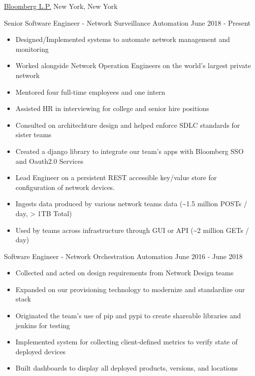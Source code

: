 \documentclass[11pt]{article}
\begin{document}
\headedsection  %
{\href{http://www.bloomberg.com/company}{Bloomberg L.P.}}
{New York, New York}
{
    \headedsubsection
    {Senior Software Engineer - Network Surveillance Automation}
    {June 2018 - Present}
    {
        \begin{itemize}
            \item Designed/Implemented systems to automate network management and monitoring
            \item Worked alongside Network Operation Engineers on the world's largest private network
            \item Mentored four full-time employees and one intern
            \item Assisted HR in interviewing for college and senior hire positions
            \item Consulted on architechture design and helped enforce SDLC standards for sister teams
            \item Created a django library to integrate our team's apps with Bloomberg SSO and Oauth2.0 Services
            \item Lead Engineer on a persistent REST accessible key/value store for configuration of network devices. 
            \item[] \nobreakhspace{1.5em}Ingests data produced by various network teams data (\textasciitilde{}1.5 million POSTs / day, > 1TB Total)
            \item[] \nobreakhspace{1.5em}Used by teams across infrastructure through GUI or API (\textasciitilde{}2 million GETs / day)
        \end{itemize}

    }
    \headedsubsection
    {Software Engineer - Network Orchestration Automation}
    {June 2016 - June 2018}
    {
        \begin{itemize}
            \item Collected and acted on design requirements from Network Design teams
            \item Expanded on our provisioning technology to modernize and standardize our stack
            \item Originated the team's use of pip and pypi to create shareable libraries and jenkins for testing
            \item Implemented system for collecting client-defined metrics to verify state of deployed devices
            \item Built dashboards to display all deployed products, versions, and locations
        \end{itemize}

}}
\end{document}
